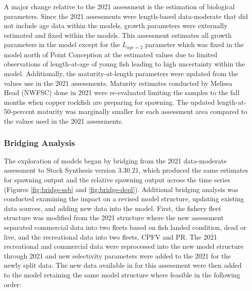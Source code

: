 \documentclass[11pt,
  english,
  letterpaper,
]{article}
\begin{document}
A major change relative to the 2021 assessment is the estimation of biological parameters. Since the 2021 assessments were length-based data-moderate that did not include age data within the models, growth parameters were externally estimated and fixed within the models. This assessment estimates all growth parameters in the model except for the \(L_{age=2}\) parameter which was fixed in the model north of Point Conception at the estimated values due to limited observations of length-at-age of young fish leading to high uncertainty within the model. Additionally, the maturity-at-length parameters were updated from the values use in the 2021 assessments. Maturity estimates conducted by Melissa Head (NWFSC) done in 2021 were re-evaluated limiting the samples to the fall months when copper rockfish are preparing for spawning. The updated length-at-50-percent maturity was marginally smaller for each assessment area compared to the values used in the 2021 assessments.

\hypertarget{bridging-analysis}{%
\subsubsection{Bridging Analysis}\label{bridging-analysis}}

The exploration of models began by bridging from the 2021 data-moderate assessment to Stock Synthesis version 3.30.21, which produced the same estimates for spawning output and the relative spawning output across the time series (Figures \ref{fig:bridge-ssb} and \ref{fig:bridge-depl}). Additional bridging analysis was conducted examining the impact on a revised model structure, updating existing data sources, and adding new data into the model. First, the fishery fleet structure was modified from the 2021 structure where the new assessment separated commercial data into two fleets based on fish landed condition, dead or live, and the recreational data into two fleets, CPFV and PR. The 2021 recreational and commercial data were reprocessed into the new model structure through 2021 and new selectivity parameters were added to the 2021 for the newly split data. The new data available in for this assessment were then added to the model retaining the same model structure where feasible in the following order:
\end{document}
